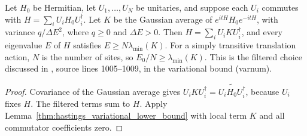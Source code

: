 \begin{lemma}
    \label{thm:hastings_gaussian_variational_lower_bound}
    \leanok
    Let $H_0$ be Hermitian, let $U_1,\ldots,U_N$ be unitaries, and suppose
    each $U_i$ commutes with $H=\sum_i U_iH_0U_i^\dagger$.
    Let $K$ be the Gaussian average of $e^{itH}H_0e^{-itH}$, with variance
    $q/\Delta E^2$, where $q\ge0$ and $\Delta E>0$. Then
    $H=\sum_iU_iKU_i^\dagger$, and every eigenvalue $E$ of $H$ satisfies
    $E\ge N\lambda_{\min}(K)$. For a simply transitive translation action,
    $N$ is the number of sites, so $E_0/N\ge\lambda_{\min}(K)$.
    This is the filtered choice discussed in \cite{Hastings2006Solving},
    source lines 1005--1009, in the variational bound (varnum).
\end{lemma}
\begin{proof}\leanok
    Covariance of the Gaussian average gives
    $U_iKU_i^\dagger=\widetilde{U_iH_0U_i^\dagger}$, because $U_i$ fixes $H$.
    The filtered terms sum to $H$. Apply
    Lemma~\ref{thm:hastings_variational_lower_bound} with local term $K$
    and all commutator coefficients zero.
\end{proof}

